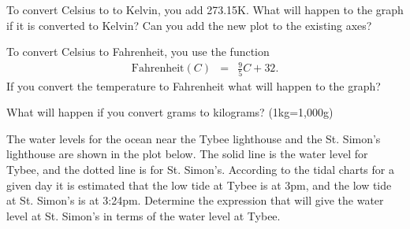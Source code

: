 \begin{problem}
\begin{subproblem}
  \item To convert Celsius to to Kelvin, you add 273.15K. What will
    happen to the graph if it is converted to Kelvin? Can you add the
    new plot to the existing axes?
    \vfill
  \item To convert Celsius to Fahrenheit, you use the function
    \begin{eqnarray*}
      \mathrm{Fahrenheit}(C) & = & \frac{9}{5}C + 32.
    \end{eqnarray*}
    If you convert the temperature to Fahrenheit what will happen to
    the graph?
    \vfill
  \item What will happen if you convert grams to kilograms? (1kg=1,000g)

  \end{subproblem}

\clearpage

\item The water levels for the ocean near the Tybee lighthouse and the
  St. Simon's lighthouse are shown in the plot below. The solid line
  is the water level for Tybee, and the dotted line is for
  St. Simon's. According to the tidal charts for a given day it is
  estimated that the low tide at Tybee is at 3pm, and the low tide at
  St. Simon's is at 3:24pm. Determine the expression that will give
  the water level at St. Simon's in terms of the water level at Tybee.

\hspace{-4em}


\end{problem}

